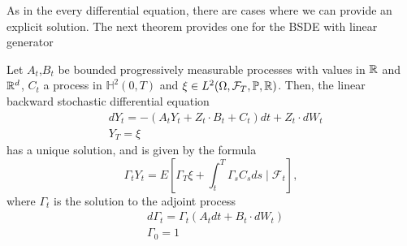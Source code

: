As in the every differential equation, there are cases where we can provide an explicit solution. The next theorem provides one for the BSDE with linear generator
\begin{theorem}
	\label{thm:linearBSDE}
	Let $A_t$,$B_t$ be bounded progressively measurable processes with values in $\mathbb{R}$ and $\mathbb{R}^d$, $C_t$ a process in $\mathbb{H}^2(0,T)$ and $\xi \in L^2(\Omega,\mathcal{F}_T,\mathbb{P},\mathbb{R})$. Then, the linear backward stochastic differential equation
	\begin{equation}
		\begin{split}
			&dY_t=-(A_tY_t+Z_t\cdot B_t+C_t)dt+Z_t\cdot dW_t\\
			&Y_T=\xi
		\end{split}
	\end{equation}
	has a unique solution, and is given by the formula
	\begin{equation}
		\Gamma_t Y_t=E\left[\Gamma_T \xi+\int_t^T \Gamma_s C_s d s \mid \mathcal{F}_t\right],
	\end{equation}
	where $\Gamma_t$ is the solution to the adjoint process
	\begin{equation}
		\begin{split}
			&d\Gamma_t=\Gamma_t(A_tdt+B_t\cdot dW_t)\\
			&\Gamma_0=1
		\end{split}
	\end{equation}	
\end{theorem}
